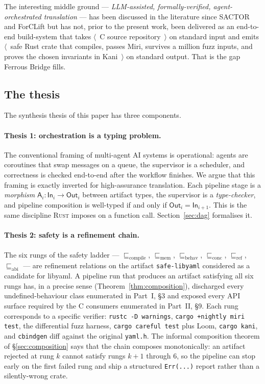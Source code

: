 \documentclass[12pt]{article}
\theoremstyle{definition}
\theoremstyle{remark}
\newcommand{\rust}{\textnormal{\textsc{Rust}}}
\newcommand{\safelibyaml}{\texttt{safe-libyaml}}
\newcommand{\Agent}[1]{\ensuremath{\mathsf{#1}}}
\newcommand{\Artifact}[1]{\ensuremath{\mathsf{#1}}}
\newcommand{\Compile}{\ensuremath{\sqsubseteq_{\!\mathrm{compile}}}}
\newcommand{\Memory}{\ensuremath{\sqsubseteq_{\!\mathrm{mem}}}}
\newcommand{\Behav}{\ensuremath{\sqsubseteq_{\!\mathrm{behav}}}}
\newcommand{\Conc}{\ensuremath{\sqsubseteq_{\!\mathrm{conc}}}}
\newcommand{\Refine}{\ensuremath{\sqsubseteq_{\!\mathrm{ref}}}}
\newcommand{\ABI}{\ensuremath{\sqsubseteq_{\!\mathrm{abi}}}}
\begin{document}
The interesting middle ground --- \emph{LLM-assisted, formally-verified,
agent-orchestrated translation} --- has been discussed in the literature
since SACTOR~\cite{sactor2025} and ForCLift but has not, prior to the
present work, been delivered as an end-to-end build-system that takes
\(\langle\)~C source repository~\(\rangle\) on standard input and emits
\(\langle\)~safe Rust crate that compiles, passes Miri, survives a
million fuzz inputs, and proves the chosen invariants in
Kani~\(\rangle\) on standard output. That is the gap Ferrous Bridge
fills.

\subsection{The thesis}
\label{sec:thesis}

The synthesis thesis of this paper has three components.

\paragraph{Thesis 1: orchestration is a typing problem.}
The conventional framing of multi-agent AI systems is operational:
agents are coroutines that swap messages on a queue, the supervisor is a
scheduler, and correctness is checked end-to-end after the workflow
finishes. We argue that this framing is exactly inverted for
high-assurance translation. Each pipeline stage is a \emph{morphism}
\(\Agent{A}_i : \Artifact{In}_i \to \Artifact{Out}_i\) between
artifact types, the supervisor is a \emph{type-checker}, and pipeline
composition is well-typed if and only if
\(\Artifact{Out}_i = \Artifact{In}_{i+1}\). This is the same discipline
\rust{} imposes on a function call. Section~\ref{sec:dag} formalises
it.

\paragraph{Thesis 2: safety is a refinement chain.}
The six rungs of the safety ladder ---
$\Compile$, $\Memory$, $\Behav$, $\Conc$, $\Refine$, $\ABI$ --- are
refinement relations on the artifact \safelibyaml{} considered as a
candidate for libyaml. A pipeline run that produces an artifact
satisfying all six rungs has, in a precise sense
(Theorem~\ref{thm:composition}), discharged every undefined-behaviour
class enumerated in Part~I, \S{}3 and exposed every API surface
required by the C consumers enumerated in Part~II, \S{}9. Each rung
corresponds to a specific verifier: \texttt{rustc -D warnings},
\texttt{cargo +nightly miri test}, the differential fuzz harness,
\texttt{cargo careful test} plus Loom, \texttt{cargo kani}, and
\texttt{cbindgen} diff against the original \texttt{yaml.h}. The
informal composition theorem of \S{}\ref{sec:composition} says that
the chain composes monotonically: an artifact rejected at rung \(k\)
cannot satisfy rungs \(k+1\) through \(6\), so the pipeline can stop
early on the first failed rung and ship a structured
\texttt{Err(...)} report rather than a silently-wrong crate.
\end{document}
